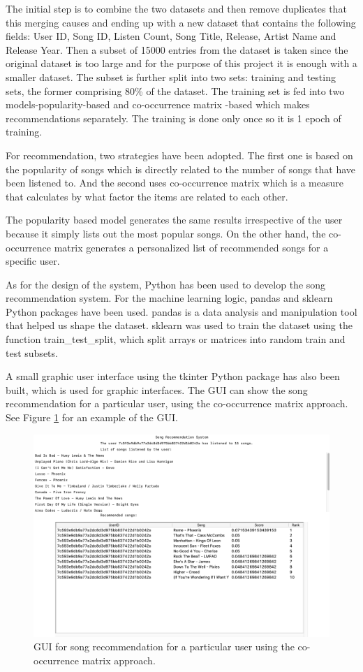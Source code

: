 \documentclass{jot}
\begin{document}
The initial step is to combine the two datasets and then remove duplicates that this merging causes and ending up with a new dataset that contains the following fields: User ID, Song ID, Listen Count, Song Title, Release, Artist Name and Release Year. Then a subset of 15000 entries from the dataset is taken since the original dataset is too large and for the purpose of this project it is enough with a smaller dataset. The subset is further split into two sets: training and testing sets, the former comprising 80\% of the dataset. The training set is fed into two models-popularity-based and co-occurrence matrix -based which makes recommendations separately. The training is done only once so it is 1 epoch of training.

For recommendation, two strategies have been adopted. The first one is based on the popularity of songs which is directly related to the number of songs that have been listened to. And the second uses co-occurrence matrix which is a measure that calculates by what factor the items are related to each other.

The popularity based model generates the same results irrespective of the user because it simply lists out the most popular songs. On the other hand, the co-occurrence matrix generates a personalized list of recommended songs for a specific user.

As for the design of the system, Python has been used to develop the song recommendation system. For the machine learning logic, pandas and sklearn Python packages have been used. pandas is a data analysis and manipulation tool that helped us shape the dataset. sklearn was used to train the dataset using the function train\_test\_split, which split arrays or matrices into random train and test subsets.

A small graphic user interface using the tkinter Python package has also been built, which is used for graphic interfaces. The GUI can show the song recommendation for a particular user, using the co-occurrence matrix approach. See Figure \ref{fig:design} for an example of the GUI.

\begin{figure}[h!]
    \centering%
    \includegraphics[width=\textwidth]{design}
    \caption{GUI for song recommendation for a particular user using the co-occurrence matrix approach.}
    \label{fig:design}
\end{figure}%
\end{document}
